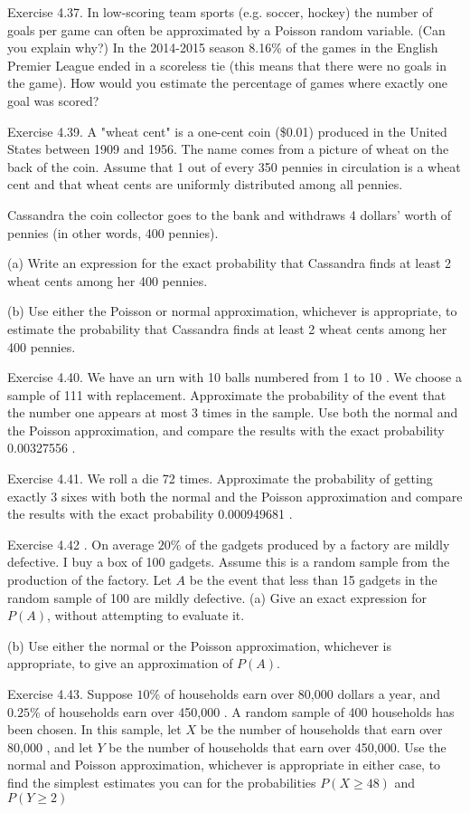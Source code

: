 \documentclass[10pt]{article}
\begin{document}
\hfill \break
Exercise 4.37. In low-scoring team sports (e.g. soccer, hockey) the number of goals per game can often be approximated by a Poisson random variable. (Can you explain why?) In the 2014-2015 season 8.16\% of the games in the English Premier League ended in a scoreless tie (this means that there were no goals in the game). How would you estimate the percentage of games where exactly one goal was scored?

\hfill \break
Exercise 4.39. A "wheat cent" is a one-cent coin (\$0.01) produced in the United States between 1909 and 1956. The name comes from a picture of wheat on the back of the coin. Assume that 1 out of every 350 pennies in circulation is a wheat cent and that wheat cents are uniformly distributed among all pennies.

Cassandra the coin collector goes to the bank and withdraws 4 dollars' worth of pennies (in other words, 400 pennies).

(a) Write an expression for the exact probability that Cassandra finds at least 2 wheat cents among her 400 pennies.

(b) Use either the Poisson or normal approximation, whichever is appropriate, to estimate the probability that Cassandra finds at least 2 wheat cents among her 400 pennies.

\hfill \break
Exercise 4.40. We have an urn with 10 balls numbered from 1 to 10 . We choose a sample of 111 with replacement. Approximate the probability of the event that the number one appears at most 3 times in the sample. Use both the normal and the Poisson approximation, and compare the results with the exact probability 0.00327556 .

\hfill \break
Exercise 4.41. We roll a die 72 times. Approximate the probability of getting exactly 3 sixes with both the normal and the Poisson approximation and compare the results with the exact probability 0.000949681 .

\hfill \break
Exercise 4.42 . On average $20 \%$ of the gadgets produced by a factory are mildly defective. I buy a box of 100 gadgets. Assume this is a random sample from the production of the factory. Let $A$ be the event that less than 15 gadgets in the random sample of 100 are mildly defective. (a) Give an exact expression for $P(A)$, without attempting to evaluate it.

(b) Use either the normal or the Poisson approximation, whichever is appropriate, to give an approximation of $P(A)$.

\hfill \break
Exercise 4.43. Suppose $10 \%$ of households earn over 80,000 dollars a year, and $0.25 \%$ of households earn over 450,000 . A random sample of 400 households has been chosen. In this sample, let $X$ be the number of households that earn over 80,000 , and let $Y$ be the number of households that earn over 450,000. Use the normal and Poisson approximation, whichever is appropriate in either case, to find the simplest estimates you can for the probabilities $P(X \geq 48)$ and $P(Y \geq 2)$
\end{document}
